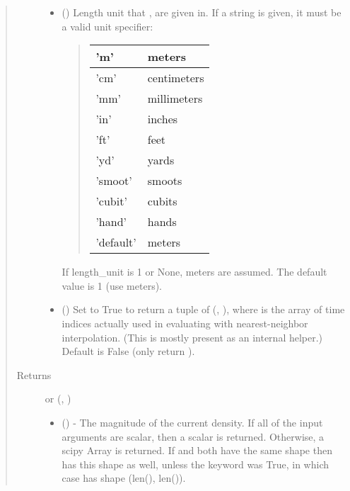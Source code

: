 \documentclass[letterpaper,10pt,english]{sphinxmanual}
\begin{document}
\begin{fulllineitems}
\begin{fulllineitems}
\begin{quote}
\begin{description}
\begin{itemize}
\item {} 
 () \textendash{} 
Length unit that ,  are given in.
If a string is given, it must be a valid unit specifier:
\begin{quote}


\begin{savenotes}\sphinxattablestart
\centering
\begin{tabulary}{\linewidth}[t]{|T|T|}
\hline

’m’
&
meters
\\
\hline
’cm’
&
centimeters
\\
\hline
’mm’
&
millimeters
\\
\hline
’in’
&
inches
\\
\hline
’ft’
&
feet
\\
\hline
’yd’
&
yards
\\
\hline
’smoot’
&
smoots
\\
\hline
’cubit’
&
cubits
\\
\hline
’hand’
&
hands
\\
\hline
’default’
&
meters
\\
\hline
\end{tabulary}
\par
\sphinxattableend\end{savenotes}
\end{quote}

If length\_unit is 1 or None, meters are assumed. The default
value is 1 (use meters).


\item {} 
 () \textendash{} Set to True to return a tuple of (,
), where  is the array of time indices
actually used in evaluating  with nearest-neighbor
interpolation. (This is mostly present as an internal helper.)
Default is False (only return ).

\end{itemize}

\item[{Returns}] \leavevmode

 or (, )
\begin{itemize}
\item {} 
 () - The magnitude of the current
density. If all of the input arguments are scalar, then a scalar
is returned. Otherwise, a scipy Array is returned. If  and 
both have the same shape then  has this shape as well, unless
the  keyword was True, in which case  has shape
(len(), len()).


\end{itemize}
\end{description}
\end{quote}
\end{fulllineitems}
\end{fulllineitems}
\end{document}
